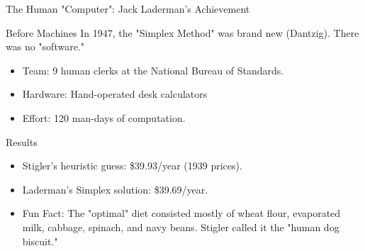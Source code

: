 \documentclass[presentation, aspectratio=169]{beamer}
\begin{document}
\begin{frame}[label={sec:org393dff1}]{The Human "Computer": Jack Laderman's Achievement}
\begin{block}{Before Machines}
In 1947, the "Simplex Method" was brand new (Dantzig). There was no "software."
\begin{itemize}
\item \alert{\alert{Team}}: 9 human clerks at the National Bureau of Standards.
\item \alert{\alert{Hardware}}: Hand-operated desk calculators
\item \alert{\alert{Effort}}: \alert{\alert{120 man-days}} of computation.
\end{itemize}
\end{block}

\begin{block}{Results}
\begin{itemize}
\item Stigler’s heuristic guess: \$39.93/year (1939 prices).
\item Laderman’s Simplex solution: \$39.69/year.
\item \alert{Fun Fact}: The "optimal" diet consisted mostly of wheat flour, evaporated milk, cabbage, spinach, and navy beans. Stigler called it the "human dog biscuit."
\end{itemize}
\end{block}
\end{frame}
\end{document}

